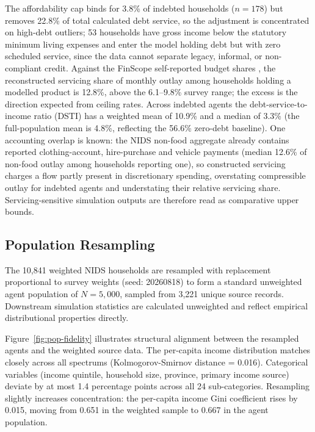 The affordability cap binds for 3.8\% of indebted households ($n = 178$) but removes 22.8\% of total calculated debt service, so the adjustment is concentrated on high-debt outliers; 53 households have gross income below the statutory minimum living expenses and enter the model holding debt but with zero scheduled service, since the data cannot separate legacy, informal, or non-compliant credit.
Against the \ac{FinScope} self-reported budget shares \cite{finscope2019}, the reconstructed servicing share of monthly outlay among households holding a modelled product is 12.8\%, above the 6.1--9.8\% survey range; the excess is the direction expected from ceiling rates.
Across indebted agents the debt-service-to-income ratio (\ac{DSTI}) has a weighted mean of 10.9\% and a median of 3.3\% (the full-population mean is 4.8\%, reflecting the 56.6\% zero-debt baseline).
One accounting overlap is known: the \ac{NIDS} non-food aggregate already contains reported clothing-account, hire-purchase and vehicle payments (median 12.6\% of non-food outlay among households reporting one), so constructed servicing charges a flow partly present in discretionary spending, overstating compressible outlay for indebted agents and understating their relative servicing share.
Servicing-sensitive simulation outputs are therefore read as comparative upper bounds.

\subsection{Population Resampling}
\label{sec:resample}

The 10{,}841 weighted \ac{NIDS} households are resampled with replacement proportional to survey weights (seed: 20260818) to form a standard unweighted agent population of $N = 5{,}000$, sampled from 3{,}221 unique source records.
Downstream simulation statistics are calculated unweighted and reflect empirical distributional properties directly.

Figure~\ref{fig:pop-fidelity} illustrates structural alignment between the resampled agents and the weighted source data.
The per-capita income distribution matches closely across all spectrums (Kolmogorov-Smirnov distance = 0.016).
Categorical variables (income quintile, household size, province, primary income source) deviate by at most 1.4 percentage points across all 24 sub-categories.
Resampling slightly increases concentration: the per-capita income Gini coefficient rises by 0.015, moving from 0.651 in the weighted sample to 0.667 in the agent population.

